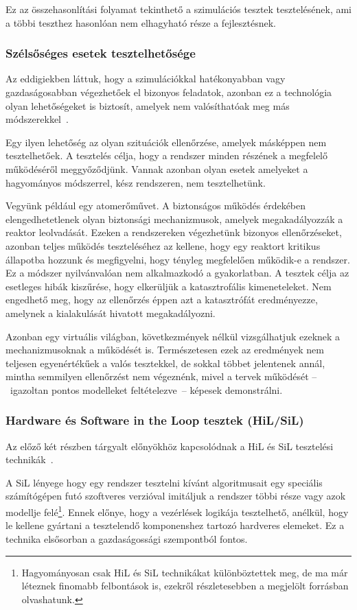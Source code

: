         Ez az összehasonlítási folyamat tekinthető a szimulációs tesztek tesztelésének, ami a többi teszthez hasonlóan nem elhagyható része a fejlesztésnek.

        \subsubsection{Szélsőséges esetek tesztelhetősége}
        Az eddigiekben láttuk, hogy a szimulációkkal hatékonyabban vagy gazdaságosabban végezhetőek el bizonyos feladatok, azonban ez a technológia olyan lehetőségeket is biztosít, amelyek nem valósíthatóak meg más módszerekkel~\cite{Gianni2017}.
        
        Egy ilyen lehetőség az olyan szituációk ellenőrzése, amelyek másképpen nem tesztelhetőek. A tesztelés célja, hogy a rendszer minden részének a megfelelő működéséről meggyőződjünk.
        Vannak azonban olyan esetek amelyeket a hagyományos módszerrel, kész rendszeren, nem tesztelhetünk.
        
        Vegyünk például egy atomerőművet. A biztonságos működés érdekében elengedhetetlenek olyan biztonsági mechanizmusok, amelyek megakadályozzák a reaktor leolvadását.
        Ezeken a rendszereken végezhetünk bizonyos ellenőrzéseket, azonban teljes működés teszteléséhez az kellene, hogy egy reaktort kritikus állapotba hozzunk és megfigyelni, hogy tényleg megfelelően működik-e a rendszer.
        Ez a módszer nyilvánvalóan nem alkalmazkodó a gyakorlatban. A tesztek célja az esetleges hibák kiszűrése, hogy elkerüljük a katasztrofális kimeneteleket. Nem engedhető meg, hogy az ellenőrzés éppen azt a katasztrófát eredményezze, amelynek a kialakulását hivatott megakadályozni.
        
        Azonban egy virtuális világban, következmények nélkül vizsgálhatjuk ezeknek a mechanizmusoknak a működését is. Természetesen ezek az eredmények nem teljesen egyenértékűek a valós tesztekkel, de sokkal többet jelentenek annál, mintha semmilyen ellenőrzést nem végeznénk, mivel a tervek működését --~igazoltan pontos modelleket feltételezve~-- képesek demonstrálni.

        \subsubsection{Hardware és Software in the Loop tesztek (HiL/SiL)}
        Az előző két részben tárgyalt előnyökhöz kapcsolódnak a HiL és SiL tesztelési technikák~\cite{MST2023}.
        
        A SiL lényege hogy egy rendszer tesztelni kívánt algoritmusait egy speciális számítógépen futó szoftveres verzióval imitáljuk a rendszer többi része vagy azok modellje felé\footnote{Hagyományosan csak HiL és SiL technikákat különböztettek meg, de ma már léteznek finomabb felbontások is, ezekről részletesebben a megjelölt forrásban olvashatunk.}.
        Ennek előnye, hogy a vezérlések logikája tesztelhető, anélkül, hogy le kellene gyártani a tesztelendő komponenshez tartozó hardveres elemeket.
        Ez a technika elsősorban a gazdaságossági szempontból fontos.
    
